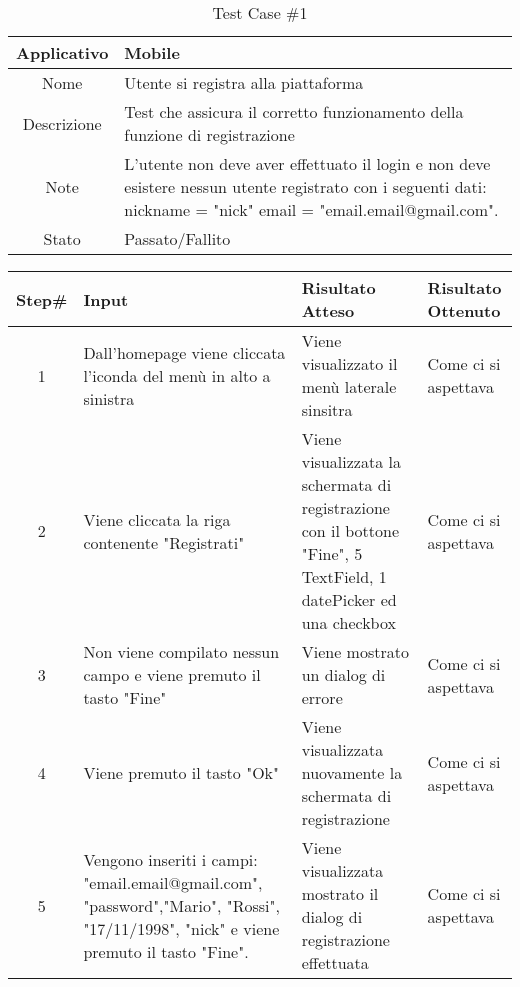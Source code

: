 
\begin{table}[H]
    \centering
    \footnotesize
    \caption{Test Case \#1}
    \begin{tabularx}{\textwidth}{|c|X|}
        \hline
        Applicativo & Mobile\\
        \hline
        Nome & Utente si registra alla piattaforma  \\
        \hline
        Descrizione & Test che assicura il corretto funzionamento della funzione di registrazione\\
        \hline
        Note &  L'utente non deve aver effettuato il login e non deve esistere nessun utente
         registrato con i seguenti dati: nickname = "nick" email = "email.email@gmail.com".\\
        \hline
        Stato & Passato/Fallito\\
        \hline

    \end{tabularx}
    \setlength{\tabcolsep}{8pt}
    \renewcommand{\arraystretch}{1.5}
\end{table}
\begin{table}[H]
    \footnotesize
    \begin{tabularx}{\textwidth}{|c|X|X|X|}
        \hline
        Step\# & Input & Risultato Atteso & Risultato Ottenuto \\
        \hline
         1 & Dall'homepage viene cliccata l'iconda del menù in alto a sinistra 
         & Viene visualizzato il menù laterale sinsitra
         &Come ci si aspettava \\
          \hline
        2 & Viene cliccata la riga contenente "Registrati"
        & Viene visualizzata la schermata di registrazione con il bottone "Fine", 5 TextField, 1 datePicker ed una checkbox
        & Come ci si aspettava\\
         \hline 
        3 & Non viene compilato nessun campo e viene premuto il tasto "Fine"
         & Viene mostrato un dialog di errore & Come ci si aspettava\\
          \hline
        4 & Viene premuto il tasto "Ok"
         & Viene visualizzata nuovamente la schermata di registrazione
         & Come ci si aspettava\\
          \hline 
          5 & Vengono inseriti i campi: "email.email@gmail.com", "password","Mario",
          "Rossi", "17/11/1998", "nick" e viene premuto il tasto "Fine".
         & Viene visualizzata mostrato il dialog di registrazione effettuata
         & Come ci si aspettava\\
          \hline           
    \end{tabularx}
\end{table}
    
       
